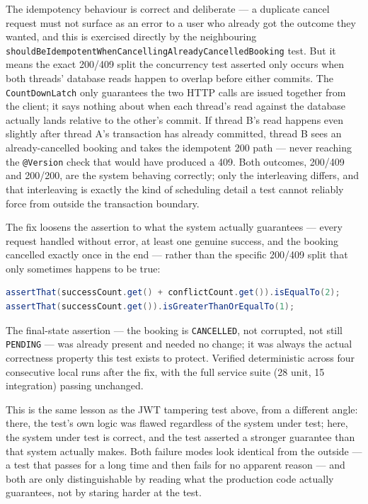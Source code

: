 The idempotency behaviour is correct and deliberate --- a duplicate cancel request must not surface as an error to a user who already got the outcome they wanted, and this is exercised directly by the neighbouring \texttt{shouldBeIdempotentWhenCancellingAlreadyCancelledBooking} test. But it means the exact 200/409 split the concurrency test asserted only occurs when both threads' database reads happen to overlap before either commits. The \texttt{CountDownLatch} only guarantees the two HTTP calls are issued together from the client; it says nothing about when each thread's read against the database actually lands relative to the other's commit. If thread B's read happens even slightly after thread A's transaction has already committed, thread B sees an already-cancelled booking and takes the idempotent 200 path --- never reaching the \texttt{@Version} check that would have produced a 409. Both outcomes, 200/409 and 200/200, are the system behaving correctly; only the interleaving differs, and that interleaving is exactly the kind of scheduling detail a test cannot reliably force from outside the transaction boundary.

The fix loosens the assertion to what the system actually guarantees --- every request handled without error, at least one genuine success, and the booking cancelled exactly once in the end --- rather than the specific 200/409 split that only sometimes happens to be true:

\begin{lstlisting}[style=javastyle, language=Java, caption={Asserting the real guarantee instead of one possible interleaving}]
assertThat(successCount.get() + conflictCount.get()).isEqualTo(2);
assertThat(successCount.get()).isGreaterThanOrEqualTo(1);
\end{lstlisting}

The final-state assertion --- the booking is \texttt{CANCELLED}, not corrupted, not still \texttt{PENDING} --- was already present and needed no change; it was always the actual correctness property this test exists to protect. Verified deterministic across four consecutive local runs after the fix, with the full service suite (28 unit, 15 integration) passing unchanged.

This is the same lesson as the JWT tampering test above, from a different angle: there, the test's own logic was flawed regardless of the system under test; here, the system under test is correct, and the test asserted a stronger guarantee than that system actually makes. Both failure modes look identical from the outside --- a test that passes for a long time and then fails for no apparent reason --- and both are only distinguishable by reading what the production code actually guarantees, not by staring harder at the test.

